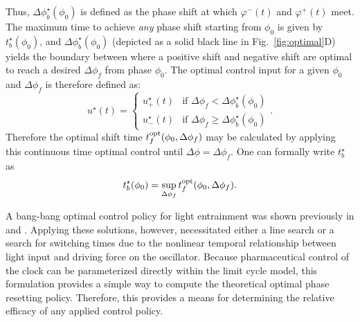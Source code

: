 Thus, $\Delta\phi^\star_b(\phi_0)$ is defined as the phase shift at which $\varphi^{-}(t)$ and $\varphi^{+}(t)$ meet.
The maximum time to achieve \textit{any} phase shift starting from $\phi_0$ is given by $t^\star_b(\phi_0)$, and $\Delta\phi^\star_b(\phi_0)$ (depicted as a solid black line in Fig.~\ref{fig:optimal}D) yields the boundary between where a positive shift and negative shift are optimal to reach a desired $\Delta\phi_f$ from phase $\phi_0$.
The optimal control input for a given $\phi_0$ and $\Delta\phi_f$ is therefore defined as:
\begin{equation}\label{eq:policy}
    u^\star(t) = \begin{cases}u^\star_+(t) &\mbox{if } \Delta\phi_f < \Delta\phi^\star_b(\phi_0) \\
       u^\star_-(t) &\mbox{if } \Delta\phi_f \geq \Delta\phi^\star_b(\phi_0) \end{cases}.
\end{equation}
Therefore the optimal shift time $t^{\rm opt}_f(\phi_0,\Delta\phi_f)$ may be calculated by applying this continuous time optimal control until $\Delta\phi=\Delta\phi_f$.
One can formally write $t^\star_b$ as
\begin{equation}
    t^\star_b(\phi_0) = \sup_{\Delta\phi_f} t^{\rm opt}_f(\phi_0,\Delta\phi_f).
\end{equation}

\begin{rmk}
A bang-bang optimal control policy for light entrainment was shown previously in \cite{Serkh2014} and \cite{Zhang2016}.
Applying these solutions, however, necessitated either a line search or a search for switching times due to the nonlinear temporal relationship between light input and driving force on the oscillator.
Because pharmaceutical control of the clock can be parameterized directly within the limit cycle model, this formulation provides a simple way to compute the theoretical optimal phase resetting policy.
Therefore, this provides a means for determining the relative efficacy of any applied control policy.
\end{rmk}

